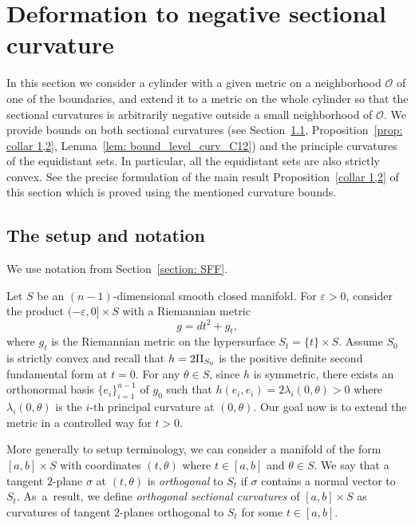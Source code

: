 \documentclass[10pt]{amsart}
\theoremstyle{definition}
\let\eps\varepsilon
\newcommand{\RomanNumeralCaps}[1]
{\MakeUppercase{\romannumeral #1}}
\newcommand{\II}{\textup{\RomanNumeralCaps{2}}}
\renewcommand{\>}{{\rangle}}
\newcommand{\<}{{\langle}}
\begin{document}
\section{Deformation to negative sectional curvature}\label{construction 1}

In this section we consider a cylinder with a given metric on a neighborhood $\mathcal O$ of one of the boundaries, and extend it to a metric on the whole cylinder so that the sectional curvatures is arbitrarily negative outside a small neighborhood of $\mathcal O$. We provide bounds on both sectional curvatures (see Section~\ref{setup notation}, Proposition~\ref{prop: collar 1,2}, Lemma~\ref{lem: bound_level_curv_C12}) and the principle curvatures of the equidistant sets. In particular, all the equidistant sets are also strictly convex. See the precise formulation of the main result Proposition~\ref{collar 1,2} of this section which is proved using the mentioned curvature bounds.

\subsection{The setup and notation}\label{setup notation}

We use notation from Section~\ref{section: SFF}.

Let $S$ be an $(n-1)$-dimensional smooth closed manifold. For $\eps>0$, consider the product $(-\eps,0]\times S$ with a Riemannian metric
\begin{equation}\label{isometry_boundary}
g = dt^2+g_t,
\end{equation}
where $g_t$ is the Riemannian metric on the hypersurface $S_t=\{t\}\times S$. Assume $S_0$ is strictly convex and recall that $h=2\II_{S_0}$ is the positive definite second fundamental form at $t=0$.
For any $\theta\in S$, since $h$ is symmetric, there exists an orthonormal basis $\{e_i\}_{i=1}^{n-1}$ of $g_0$ such that $h(e_i,e_i)=2\lambda_i(0,\theta)>0$ where $\lambda_i(0,\theta)$ is the $i$-th principal curvature at $(0,\theta)$.
Our goal now is to extend the metric in a controlled way for $t>0$.

More generally to setup terminology, we can consider a manifold of the form \hbox{$[a,b]\times S$} with coordinates $(t,\theta)$ where $t\in[a,b]$ and $\theta\in S$. We say that a tangent $2$-plane $\sigma$ at $(t,\theta)$ is \textit{orthogonal} to $S_t$ if $\sigma$ contains a normal vector to $S_t$. As~a~result, we define \textit{orthogonal sectional curvatures} of $[a,b]\times S$ as curvatures of tangent $2$-planes orthogonal to $S_t$ for some $t\in[a,b]$.
\end{document}

